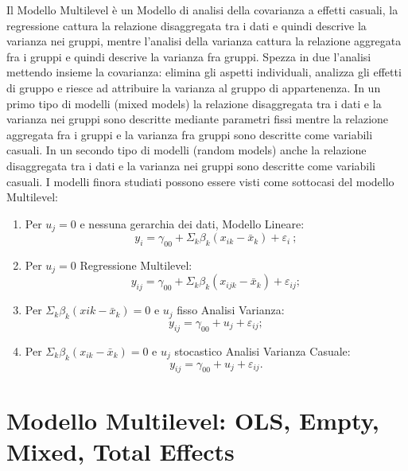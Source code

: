 \documentclass[a4page, 11pt]{article} %
\begin{document}
Il Modello Multilevel è un Modello di analisi della covarianza a effetti casuali, la regressione cattura la relazione disaggregata tra i dati e quindi descrive la varianza nei gruppi, mentre l’analisi della varianza cattura la relazione aggregata fra i gruppi e quindi descrive la varianza fra gruppi. Spezza in due l’analisi mettendo insieme la covarianza: elimina gli aspetti individuali, analizza gli effetti di gruppo e riesce ad attribuire la varianza al gruppo di appartenenza.
\newline
In un primo tipo di modelli (mixed models) la relazione disaggregata tra i dati e la varianza nei gruppi sono descritte mediante parametri fissi mentre la relazione aggregata fra i gruppi
e la varianza fra gruppi sono descritte come variabili casuali.
\newline
In un secondo tipo di modelli (random models) anche la relazione disaggregata tra i dati e la varianza nei gruppi sono descritte come variabili casuali.
\newline
I modelli finora studiati possono essere visti come sottocasi del modello Multilevel:
\begin{enumerate}
\item Per $u_j=0$ e nessuna gerarchia dei dati, Modello Lineare: 
\begin{equation*}
y_i= \gamma_{00}+\Sigma_k \beta_k(x_{ik}-\bar{x}_k) + \varepsilon_i \ ;
\end{equation*}
\item Per $u_j=0$ Regressione Multilevel: 
\begin{equation*}
y_{ij} = \gamma_{00} + \Sigma_k \beta_k(x_{ijk}-\bar{x}_k) + \varepsilon_{ij};
\end{equation*}
\item Per $\Sigma_k \beta_k (x{ik} - \bar{x}_k) = 0$ e $u_j$ fisso Analisi Varianza: 
\begin{equation*}
y_{ij} = \gamma_{00}+ u_j + \varepsilon_{ij};
\end{equation*}
\item Per $\Sigma_k\beta_k(x_{ik}- \bar{x}_k) = 0$ e $u_j$ stocastico Analisi Varianza Casuale: 
\begin{equation*}
y_{ij} = \gamma_{00} + u_j + \varepsilon_{ij}.
\end{equation*}
\end{enumerate}

\section{Modello Multilevel: OLS, Empty, Mixed, Total Effects}
\end{document}
